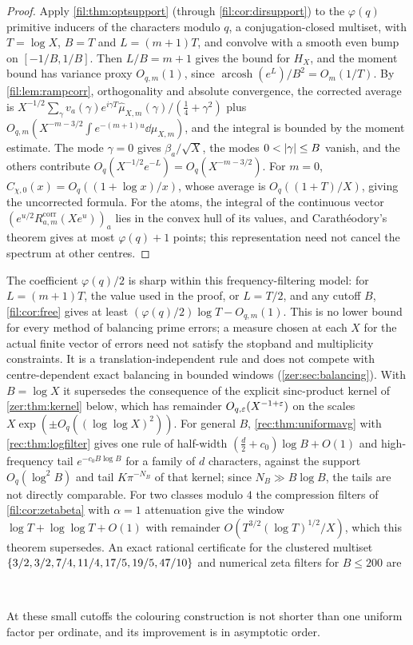 \begin{proof}
Apply \cref{fil:thm:optsupport} (through \cref{fil:cor:dirsupport}) to the $\varphi(q)$ primitive inducers of the
characters modulo $q$, a conjugation-closed multiset, with $T=\log X$, $B=T$ and $L=(m+1)T$, and convolve with a
smooth even bump on $[-1/B,1/B]$. Then $L/B=m+1$ gives the bound for $H_X$, and the moment bound has variance
proxy $O_{q,m}(1)$, since $\operatorname{arcosh}(e^L)/B^2=O_m(1/T)$. By \cref{fil:lem:rampcorr}, orthogonality and
absolute convergence, the corrected average is $X^{-1/2}\sum_\gamma v_a(\gamma)e^{i\gamma T}\widehat\mu_{X,m}(\gamma)/(\tfrac14+\gamma^2)$
plus $O_{q,m}(X^{-m-3/2}\int e^{-(m+1)u}\dd\mu_{X,m})$, and the integral is bounded by the moment estimate. The mode
$\gamma=0$ gives $\beta_a/\sqrt X$, the modes $0<\lvert\gamma\rvert\le B$ vanish, and the others contribute
$O_q(X^{-1/2}e^{-L})=O_q(X^{-m-3/2})$. For $m=0$, $C_{\chi,0}(x)=O_q((1+\log x)/x)$, whose average is
$O_q((1+T)/X)$, giving the uncorrected formula. For the atoms, the integral of the continuous vector
$(e^{u/2}R^{\mathrm{corr}}_{a,m}(Xe^u))_a$ lies in the convex hull of its values, and Carath\'eodory's theorem gives at
most $\varphi(q)+1$ points; this representation need not cancel the spectrum at other centres.
\end{proof}

The coefficient $\varphi(q)/2$ is sharp within this frequency-filtering model: for $L=(m+1)T$, the value used in the proof, or
$L=T/2$, and any cutoff $B$, \cref{fil:cor:free} gives at least $(\varphi(q)/2)\log T-O_{q,m}(1)$. This is no lower bound for every method of
balancing prime errors; a measure chosen at each $X$ for the actual finite vector of errors need not satisfy the
stopband and multiplicity constraints. It is a translation-independent rule and does not compete with
centre-dependent exact balancing in bounded windows (\cref{zer:sec:balancing}). With $B=\log X$ it supersedes
the consequence of the explicit sinc-product kernel of \cref{zer:thm:kernel} below, which has remainder
$O_{q,\varepsilon}(X^{-1+\varepsilon})$ on the scales $X\exp(\pm O_q((\log\log X)^2))$. For general $B$,
\cref{rec:thm:uniformavg} with \cref{rec:thm:logfilter} gives one rule of half-width
$(\frac d2+c_0)\log B+O(1)$ and high-frequency tail $e^{-c_0B\log B}$ for a family of $d$ characters,
against the support $O_q(\log^2B)$ and tail $K\pi^{-N_B}$ of that kernel; since $N_B\gg B\log B$, the tails
are not directly comparable. For two classes modulo $4$ the compression filters of \cref{fil:cor:zetabeta} with $\alpha=1$ attenuation
give the window $\log T+\log\log T+O(1)$ with remainder $O(T^{3/2}(\log T)^{1/2}/X)$, which this theorem
supersedes. An exact rational certificate for the clustered multiset $\{3/2,3/2,7/4,11/4,17/5,19/5,47/10\}$ and
numerical zeta filters for $B\le200$ are
\begin{center}
\\
\end{center}
At these small cutoffs the colouring construction is not shorter than one uniform factor per ordinate, and its
improvement is in asymptotic order.

